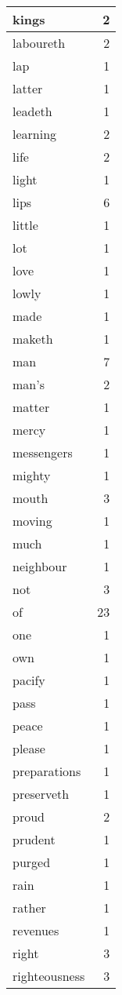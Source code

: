 \begin{center}
\begin{longtable}{l|r}
kings & 2\\ \hline 
laboureth & 2\\ \hline 
lap & 1\\ \hline 
latter & 1\\ \hline 
leadeth & 1\\ \hline 
learning & 2\\ \hline 
life & 2\\ \hline 
light & 1\\ \hline 
lips & 6\\ \hline 
little & 1\\ \hline 
lot & 1\\ \hline 
love & 1\\ \hline 
lowly & 1\\ \hline 
made & 1\\ \hline 
maketh & 1\\ \hline 
man & 7\\ \hline 
man's & 2\\ \hline 
matter & 1\\ \hline 
mercy & 1\\ \hline 
messengers & 1\\ \hline 
mighty & 1\\ \hline 
mouth & 3\\ \hline 
moving & 1\\ \hline 
much & 1\\ \hline 
neighbour & 1\\ \hline 
not & 3\\ \hline 
of & 23\\ \hline 
one & 1\\ \hline 
own & 1\\ \hline 
pacify & 1\\ \hline 
pass & 1\\ \hline 
peace & 1\\ \hline 
please & 1\\ \hline 
preparations & 1\\ \hline 
preserveth & 1\\ \hline 
proud & 2\\ \hline 
prudent & 1\\ \hline 
purged & 1\\ \hline 
rain & 1\\ \hline 
rather & 1\\ \hline 
revenues & 1\\ \hline 
right & 3\\ \hline 
righteousness & 3\\ \hline 

\end{longtable}
\end{center}
